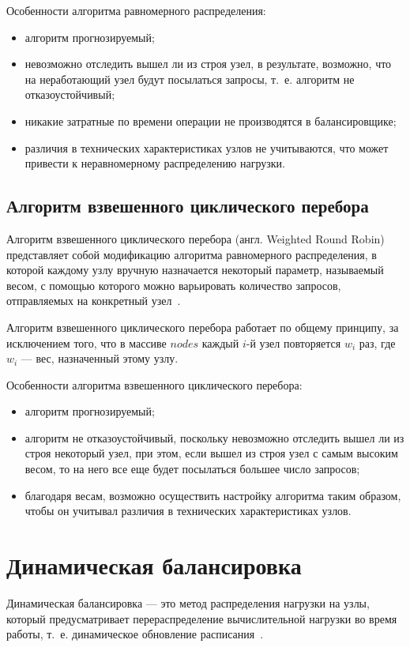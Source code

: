 Особенности алгоритма равномерного распределения:
\begin{itemize}
	\item алгоритм прогнозируемый;
	\item невозможно отследить вышел ли из строя узел, в результате, возможно, что на неработающий узел будут посылаться запросы, т.~е. алгоритм не отказоустойчивый;
	\item никакие затратные по времени операции не производятся в балансировщике;
	\item различия в технических характеристиках узлов не учитываются, что может привести к неравномерному распределению нагрузки.
\end{itemize}


\subsection*{Алгоритм взвешенного циклического перебора}

Алгоритм взвешенного циклического перебора (англ. Weighted Round Robin) представляет собой модификацию алгоритма равномерного распределения, в которой каждому узлу вручную назначается некоторый параметр, называемый весом, с помощью которого можно варьировать количество запросов, отправляемых на конкретный узел~\cite{part_algos}.

Алгоритм взвешенного циклического перебора работает по общему принципу, за исключением того, что в массиве $nodes$ каждый $i$-й узел повторяется $w_i$ раз, где $w_i$ --- вес, назначенный этому узлу.

Особенности алгоритма взвешенного циклического перебора:
\begin{itemize}
	\item алгоритм прогнозируемый;
	\item алгоритм не отказоустойчивый, поскольку невозможно отследить вышел ли из строя некоторый узел, при этом, если вышел из строя узел с самым высоким весом, то на него все еще будет посылаться большее число запросов;
	\item благодаря весам, возможно осуществить настройку алгоритма таким образом, чтобы он учитывал различия в технических характеристиках узлов.
\end{itemize}


\section{Динамическая балансировка}

Динамическая балансировка --- это метод распределения нагрузки на узлы, который предусматривает перераспределение вычислительной нагрузки во время работы, т.~е. динамическое обновление расписания~\cite{intuit}.
 

